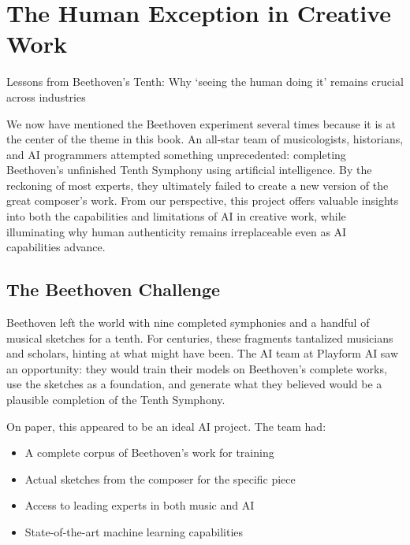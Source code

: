 \documentclass[
  Letterpaper,
]{scrbook}
\providecommand{\tightlist}{%
  \setlength{\itemsep}{0pt}\setlength{\parskip}{0pt}}\usepackage{longtable,booktabs,array}
\begin{document}

\chapter{The Human Exception in Creative
Work}\label{the-human-exception-in-creative-work}

Lessons from Beethoven's Tenth: Why `seeing the human doing it' remains
crucial across industries

\hfill\break

We now have mentioned the Beethoven experiment several times because it
is at the center of the theme in this book. An all-star team of
musicologists, historians, and AI programmers attempted something
unprecedented: completing Beethoven's unfinished Tenth Symphony using
artificial intelligence. By the reckoning of most experts, they
ultimately failed to create a new version of the great composer's work.
From our perspective, this project offers valuable insights into both
the capabilities and limitations of AI in creative work, while
illuminating why human authenticity remains irreplaceable even as AI
capabilities advance.

\section{The Beethoven Challenge}\label{the-beethoven-challenge}

Beethoven left the world with nine completed symphonies and a handful of
musical sketches for a tenth. For centuries, these fragments tantalized
musicians and scholars, hinting at what might have been. The AI team at
Playform AI saw an opportunity: they would train their models on
Beethoven's complete works, use the sketches as a foundation, and
generate what they believed would be a plausible completion of the Tenth
Symphony.

On paper, this appeared to be an ideal AI project. The team had:

\begin{itemize}
\tightlist
\item
  A complete corpus of Beethoven's work for training
\item
  Actual sketches from the composer for the specific piece
\item
  Access to leading experts in both music and AI
\item
  State-of-the-art machine learning capabilities
\end{itemize}
\end{document}
